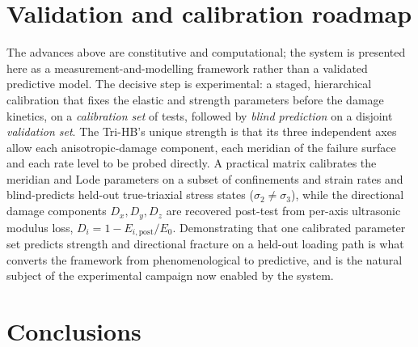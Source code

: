 \documentclass[sn-basic]{sn-jnl}
\begin{document}
\section{Validation and calibration roadmap}\label{sec:roadmap}

The advances above are constitutive and computational; the system is presented
here as a measurement-and-modelling framework rather than a validated predictive
model. The decisive step is experimental: a staged, hierarchical calibration
that fixes the elastic and strength parameters before the damage kinetics, on a
\emph{calibration set} of tests, followed by \emph{blind prediction} on a disjoint
\emph{validation set}. The Tri-HB's unique strength is that its three independent
axes allow each anisotropic-damage component, each meridian of the failure
surface and each rate level to be probed directly. A practical matrix calibrates
the meridian and Lode parameters on a subset of confinements and strain rates and
blind-predicts held-out true-triaxial stress states ($\sigma_2\neq\sigma_3$),
while the directional damage components $D_x,D_y,D_z$ are
recovered post-test from per-axis ultrasonic modulus loss,
$D_i=1-E_{i,\mathrm{post}}/E_0$. Demonstrating that one calibrated parameter set
predicts strength and directional fracture on a held-out loading path is what
converts the framework from phenomenological to predictive, and is the natural
subject of the experimental campaign now enabled by the system.

\section{Conclusions}\label{sec:conclusion}
\end{document}
